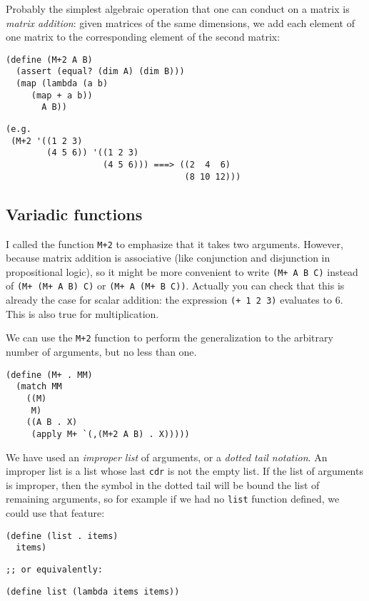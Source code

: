 Probably the simplest algebraic operation that one can
conduct on a matrix is \textit{matrix addition}: given
matrices of the same dimensions, we add each element
of one matrix to the corresponding element of the
second matrix:

\begin{Verbatim}[samepage=true]
(define (M+2 A B)
  (assert (equal? (dim A) (dim B)))
  (map (lambda (a b)
	 (map + a b))
       A B))
\end{Verbatim}
\begin{Verbatim}[samepage=true]
(e.g.
 (M+2 '((1 2 3)
        (4 5 6)) '((1 2 3)
                   (4 5 6))) ===> ((2  4  6)
                                   (8 10 12)))
\end{Verbatim}

\subsection{Variadic functions}

I called the function \texttt{M+2} to emphasize that it
takes two arguments. However, because matrix addition is
associative (like conjunction and disjunction in propositional
logic), so it might be more convenient to write
\texttt{(M+ A B C)} instead of \texttt{(M+ (M+ A B) C)}
or \texttt{(M+ A (M+ B C))}. Actually you can check that
this is already the case for scalar addition: the
expression \texttt{(+ 1 2 3)} evaluates to $6$. This
is also true for multiplication.

We can use the \texttt{M+2} function to perform the
generalization to the arbitrary number of arguments,
but no less than one.

\begin{Verbatim}[samepage=true]
(define (M+ . MM)
  (match MM
    ((M)
     M)
    ((A B . X)
     (apply M+ `(,(M+2 A B) . X)))))
\end{Verbatim}

We have used an \textit{improper list} of arguments,
or a \textit{dotted tail notation}. An improper list
is a list whose last \texttt{cdr} is not the empty
list. If the list of arguments is improper, then the
symbol in the dotted tail will be bound the list of
remaining arguments, so for example if we had no
\texttt{list} function defined, we could use that
feature:

\begin{Verbatim}[samepage=true]
(define (list . items)
  items)
\end{Verbatim}
\begin{Verbatim}[samepage=true]
;; or equivalently:
\end{Verbatim}
\begin{Verbatim}[samepage=true]
(define list (lambda items items))
\end{Verbatim}

